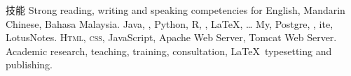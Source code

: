 
\begin{rubric}{技能}
\entry*[Languages]
	Strong reading, writing and speaking competencies for English, Mandarin Chinese, Bahasa Malaysia.
	Java, , Python, R, , \LaTeX, \ldots
\entry*[Databases]
	My, Postgre, , ite, LotusNotes.
	\textsc{Html, css}, JavaScript, Apache Web Server, Tomcat Web Server.
\entry*[Misc.]
	Academic research, teaching, training, consultation, \LaTeX\ typesetting and publishing.
\end{rubric}
